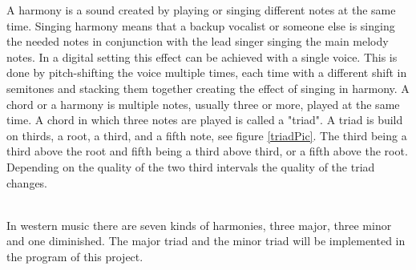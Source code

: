 A harmony is a sound created by playing or singing different notes at the same time\citep{Harmonise02}.
Singing harmony means that a backup vocalist or someone else is singing the needed notes in conjunction with the lead singer singing the main melody notes. In a digital setting this effect can be achieved with a single voice. This is done by pitch-shifting the voice multiple times, each time with a different shift in semitones and stacking them together creating the effect of singing in harmony. 
A chord or a harmony is multiple notes, usually three or more, played at the same time. A chord in which three notes are played is called a "triad"\citep{Harmonise01}. A triad is build on thirds, a root, a third, and a fifth note, see figure \ref{triadPic}. The third being a third above the root and fifth being a third above third, or a fifth above the root. Depending on the quality of the two third intervals the quality of the triad changes. \\

\begin{minipage}{\linewidth}%
\label{triadPic}
\end{minipage}\\

In western music there are seven kinds of harmonies, three major, three minor and one diminished. The major triad and the minor triad will be implemented in the program of this project.